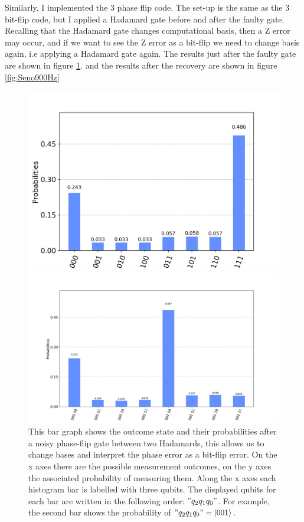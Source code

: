 Similarly, I implemented the 3 phase flip code. 
The set-up is the same as the 3 bit-flip code, but I applied a Hadamard gate before and after the faulty gate. 
Recalling that the Hadamard gate changes computational basis, then a Z error may occur, and if we want to see the Z error as a bit-flip we need to change basis again, i.e applying a Hadamard gate again.
The results just after the faulty gate are shown in figure \ref{fig:Seno200Hz}. 
and the results after the recovery are shown in figure \ref{fig:Seno900Hz}
\begin{figure}[h!]
\begin{minipage}[t]{0.49\textwidth}
\includegraphics[width=\linewidth]{Mainmatter/images/Result_phase_justafter.png}
\caption{This bar graph shows the outcome state and their probabilities after a noisy phase-flip gate between two Hadamards, this allows us to change bases and interpret the phase error as a bit-flip error. On the x axes there are the possible measurement outcomes, on the y axes the associated probability of measuring them. Along the x axes each histogram bar is labelled with three qubits. The displayed qubits for each bar are written in the following order: $"q_2 q_1 q_0"$. For example, the second bar shows the probability of $"q_2 q_1 q_0"=\ket{001}$.}
\label{fig:Seno200Hz}
\end{minipage}
\hspace{0.65cm}
\begin{minipage}[t]{0.6\textwidth}
\includegraphics[width=\linewidth]{Mainmatter/images/3Phase_Results.png}

\end{minipage}
\end{figure}

